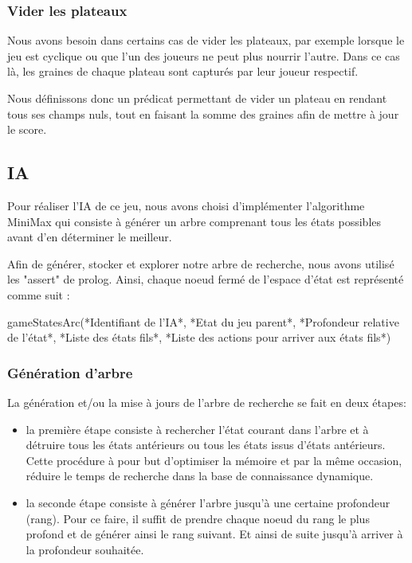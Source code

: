 \documentclass[]{article}
\begin{document}
\subsubsection{Vider les plateaux}

Nous avons besoin dans certains cas de vider les plateaux, par exemple lorsque le jeu est cyclique ou que l'un des joueurs ne peut plus nourrir l'autre. Dans ce cas là, les graines de chaque plateau sont capturés par leur joueur respectif.

Nous définissons donc un prédicat permettant de vider un plateau en rendant tous ses champs nuls, tout en faisant la somme des graines afin de mettre à jour le score. 

\subsection{IA}

Pour réaliser l'IA de ce jeu, nous avons choisi d'implémenter l'algorithme MiniMax qui consiste à générer un arbre comprenant tous les états possibles avant d'en déterminer le meilleur. 

Afin de générer, stocker et explorer notre arbre de recherche, nous avons utilisé les "assert" de prolog. Ainsi, chaque noeud fermé de l'espace d'état est représenté comme suit :

	gameStatesArc(*Identifiant de l'IA*, *Etat du jeu parent*, *Profondeur relative de l'état*, *Liste des états fils*, *Liste des actions pour arriver aux états fils*)

\subsubsection{Génération d'arbre}

La génération et/ou la mise à jours de l'arbre de recherche se fait en deux étapes:
\begin{itemize}
\item la première étape consiste à rechercher l'état courant dans l'arbre et à détruire tous les états antérieurs ou tous les états issus d'états antérieurs. Cette procédure à pour but d'optimiser la mémoire et par la même occasion, réduire le temps de recherche dans la base de connaissance dynamique.
\item la seconde étape consiste à générer l'arbre jusqu'à une certaine profondeur (rang). Pour ce faire, il suffit de prendre chaque noeud du rang le plus profond et de générer ainsi le rang suivant. Et ainsi de suite jusqu'à arriver à la profondeur souhaitée.
\end{itemize}
\end{document}

